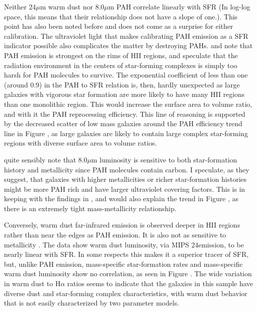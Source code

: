 Neither 24$\mu$m warm dust nor 8.0$\mu$m PAH correlate linearly with SFR (In log-log space, this means that their relationship does not have a slope of one.). This point has also been noted before \citep{Wu,Calzetti2007,Calzetti2010} and does not come as a surprise for either calibration. The ultraviolet light that makes calibrating PAH emission as a SFR indicator possible also complicates the matter by destroying PAHs. \cite{Helou} and \cite{Bendo} note that PAH emission is strongest on the rims of HII regions, and speculate that the radiation environment in the centers of star-forming complexes is simply too harsh for PAH molecules to survive. The exponential coefficient of less than one (around 0.9) in the PAH to SFR relation is, then, hardly unexpected as large galaxies with vigorous star formation are more likely to have many HII regions than one monolithic region. This would increase the surface area to volume ratio, and with it the PAH reprocessing efficiency. This line of reasoning is supported by the decreased scatter of low mass galaxies around the PAH efficiency trend line in Figure , as large galaxies are likely to contain large complex star-forming regions with diverse surface area to volume ratios.

\cite{Calzetti2007} quite sensibly note that 8.0$\mu$m luminosity is sensitive to both star-formation history and metallicity since PAH molecules contain carbon. I speculate, as they suggest, that galaxies with higher metallicities or richer star-formation histories might be more PAH rich and have larger ultraviolet covering factors. This is in keeping with the findings in \cite{Engelbracht}, and would also explain the trend in Figure , as there is an extremely tight mass-metallicity relationship.

Conversely, warm dust far-infrared emission is observed deeper in HII regions rather than near the edges as PAH emission. It is also not as sensitive to metallicity \citep{Calzetti2010}. The data show warm dust luminosity, via MIPS 24\micron emission, to be nearly linear with SFR. In some respects this makes it a superior tracer of SFR, but, unlike PAH emission, mass-specific star-formation rates and mass-specific warm dust luminosity show no correlation, as seen in Figure . The wide variation in warm dust to H$\alpha$ ratios seems to indicate that the galaxies in this sample have diverse dust and star-forming complex characteristics, with warm dust behavior that is not easily characterized by two parameter models.

